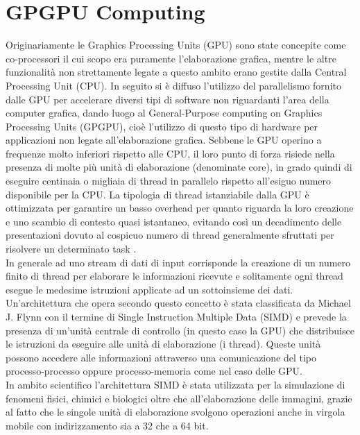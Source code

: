 \section{GPGPU Computing}

Originariamente le Graphics Processing Units (GPU) sono state concepite
come co-processori il cui scopo
era puramente l'elaborazione grafica, mentre le altre funzionalità
non strettamente legate a questo ambito erano gestite dalla 
Central Processing Unit (CPU).
In seguito si è diffuso l'utilizzo del parallelismo fornito dalle GPU
per accelerare diversi tipi di software non riguardanti
l'area della computer grafica, dando luogo al General-Purpose computing
on Graphics Processing Units (GPGPU), cioè l'utilizzo di questo tipo di hardware
per applicazioni non legate all'elaborazione grafica.
Sebbene le GPU operino a frequenze molto inferiori rispetto alle CPU, il loro
punto di forza risiede nella presenza di molte più unità di elaborazione
(denominate core), in grado quindi di eseguire centinaia o migliaia di thread
in parallelo rispetto all'esiguo numero disponibile per la CPU.
La tipologia di thread
istanziabile dalla GPU è ottimizzata per garantire un basso overhead
per quanto riguarda la loro creazione e uno scambio di contesto quasi
istantaneo, evitando così un decadimento delle presentazioni dovuto al cospicuo
numero di thread generalmente sfruttati per risolvere un determinato task
\cite{kirk2007nvidia}.
\\
In generale ad uno stream di dati di input corrisponde la creazione di un
numero finito di thread per elaborare le informazioni ricevute e solitamente
ogni thread esegue le medesime istruzioni applicate ad un sottoinsieme
dei dati. Un'architettura che opera secondo questo concetto è stata
classificata da Michael J. Flynn con il termine di Single Instruction Multiple 
Data (SIMD)\cite{duncan1990survey} e prevede
la presenza di un'unità centrale di controllo (in questo caso la GPU) che
distribuisce le istruzioni da eseguire alle unità di elaborazione (i thread).
Queste unità possono accedere alle informazioni attraverso una comunicazione
del tipo processo-processo oppure processo-memoria come nel caso delle GPU.
\\
In ambito scientifico l'architettura SIMD è stata utilizzata per la simulazione
di fenomeni fisici, chimici e biologici oltre che all'elaborazione delle
immagini, grazie al fatto che le singole unità di elaborazione svolgono
operazioni anche in virgola mobile con indirizzamento sia a 32 che a 64 bit.
\\
